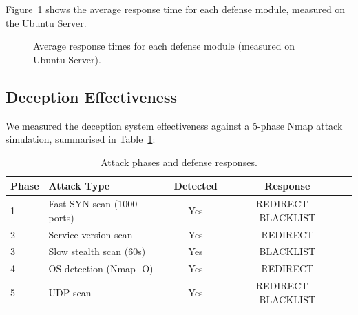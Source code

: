 Figure~\ref{fig:timing} shows the average response time for each defense module, measured on the Ubuntu Server.

\begin{figure}[H]
\centering
{}
\caption{Average response times for each defense module (measured on Ubuntu Server).}
\label{fig:timing}
\end{figure}

\subsection{Deception Effectiveness}

We measured the deception system effectiveness against a 5-phase Nmap attack simulation, summarised in Table~\ref{tab:attack_results}:

\begin{table}[H]
\centering
\caption{Attack phases and defense responses.}
\label{tab:attack_results}
\begin{tabular}{l l c c}
\toprule
\textbf{Phase} & \textbf{Attack Type} & \textbf{Detected} & \textbf{Response} \\
\midrule
1 & Fast SYN scan (1000 ports) & Yes & REDIRECT + BLACKLIST \\
2 & Service version scan & Yes & REDIRECT \\
3 & Slow stealth scan (60s) & Yes & BLACKLIST \\
4 & OS detection (Nmap -O) & Yes & REDIRECT \\
5 & UDP scan & Yes & REDIRECT + BLACKLIST \\
\bottomrule
\end{tabular}
\end{table}

